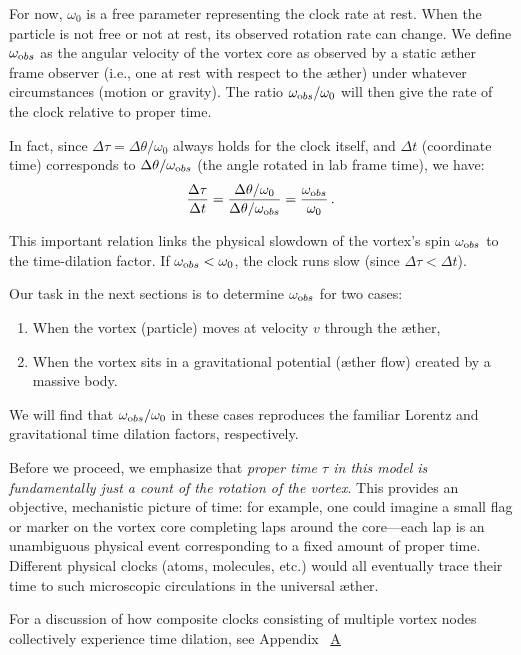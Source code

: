 \documentclass[a4paper,12pt]{article}
\begin{document}
For now, $\omega_0$ is a free parameter representing the clock rate at rest. When the particle is not free or not at rest, its observed rotation rate can change. We define $\omega_{\textrm obs}$ as the angular velocity of the vortex core as observed by a static æther frame observer (i.e., one at rest with respect to the æther) under whatever circumstances (motion or gravity). The ratio $\omega_{\textrm obs}/\omega_0$ will then give the rate of the clock relative to proper time.

In fact, since $\Delta \tau = \Delta \theta / \omega_0$ always holds for the clock itself, and $\Delta t$ (coordinate time) corresponds to $\Delta \theta / \omega_{\textrm obs}$ (the angle rotated in lab frame time), we have:
\begin{equation}
\frac{\Delta \tau}{\Delta t} = \frac{\Delta \theta / \omega_0}{\Delta \theta / \omega_{\textrm obs}} = \frac{\omega_{\textrm obs}}{\omega_0} \,.
\end{equation}

This important relation links the physical slowdown of the vortex's spin $\omega_{\textrm obs}$ to the time-dilation factor. If $\omega_{\textrm obs} < \omega_0$, the clock runs slow (since $\Delta \tau < \Delta t$).

Our task in the next sections is to determine $\omega_{\textrm obs}$ for two cases:
\begin{enumerate}
    \item When the vortex (particle) moves at velocity $v$ through the æther,
    \item When the vortex sits in a gravitational potential (æther flow) created by a massive body.
\end{enumerate}
We will find that $\omega_{\textrm obs}/\omega_0$ in these cases reproduces the familiar Lorentz and gravitational time dilation factors, respectively.

Before we proceed, we emphasize that \emph{proper time $\tau$ in this model is fundamentally just a count of the rotation of the vortex}. This provides an objective, mechanistic picture of time: for example, one could imagine a small flag or marker on the vortex core completing laps around the core—each lap is an unambiguous physical event corresponding to a fixed amount of proper time. Different physical clocks (atoms, molecules, etc.) would all eventually trace their time to such microscopic circulations in the universal æther.

For a discussion of how composite clocks consisting of multiple vortex nodes collectively experience time dilation, see Appendix~ \hyperref[appendix:ClocksInVortexStructures]{A}
\end{document}
